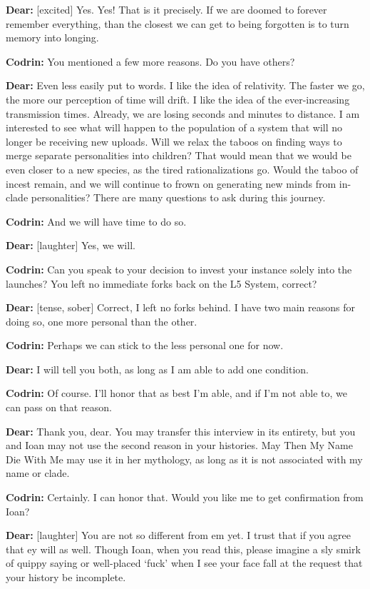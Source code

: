 \textbf{Dear:} {[}excited{]} Yes. Yes! That is it precisely. If we are doomed to forever remember everything, than the closest we can get to being forgotten is to turn memory into longing.

\textbf{Codrin:} You mentioned a few more reasons. Do you have others?

\textbf{Dear:} Even less easily put to words. I like the idea of relativity. The faster we go, the more our perception of time will drift. I like the idea of the ever-increasing transmission times. Already, we are losing seconds and minutes to distance. I am interested to see what will happen to the population of a system that will no longer be receiving new uploads. Will we relax the taboos on finding ways to merge separate personalities into children? That would mean that we would be even closer to a new species, as the tired rationalizations go. Would the taboo of incest remain, and we will continue to frown on generating new minds from in-clade personalities? There are many questions to ask during this journey.

\textbf{Codrin:} And we will have time to do so.

\textbf{Dear:} {[}laughter{]} Yes, we will.

\textbf{Codrin:} Can you speak to your decision to invest your instance solely into the launches? You left no immediate forks back on the L5 System, correct?

\textbf{Dear:} {[}tense, sober{]} Correct, I left no forks behind. I have two main reasons for doing so, one more personal than the other.

\textbf{Codrin:} Perhaps we can stick to the less personal one for now.

\textbf{Dear:} I will tell you both, as long as I am able to add one condition.

\textbf{Codrin:} Of course. I'll honor that as best I'm able, and if I'm not able to, we can pass on that reason.

\textbf{Dear:} Thank you, dear. You may transfer this interview in its entirety, but you and Ioan may not use the second reason in your histories. May Then My Name Die With Me may use it in her mythology, as long as it is not associated with my name or clade.

\textbf{Codrin:} Certainly. I can honor that. Would you like me to get confirmation from Ioan?

\textbf{Dear:} {[}laughter{]} You are not so different from em yet. I trust that if you agree that ey will as well. Though Ioan, when you read this, please imagine a sly smirk of quippy saying or well-placed `fuck' when I see your face fall at the request that your history be incomplete.

